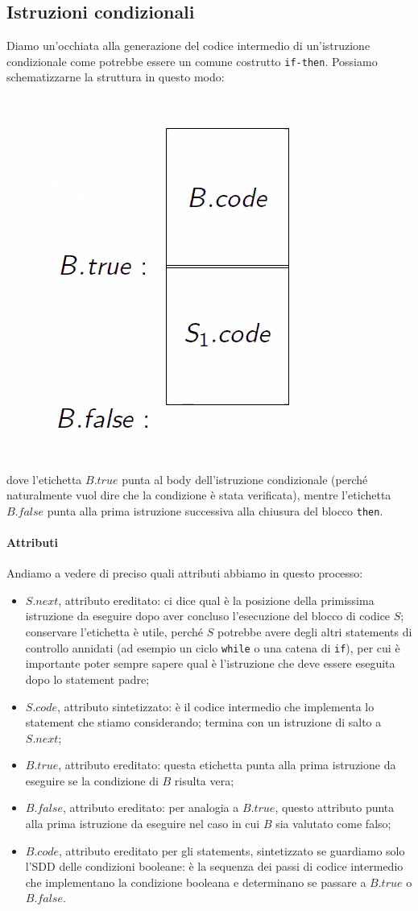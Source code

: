 \documentclass[class=book, crop=false, oneside, 12pt]{standalone}
\begin{document}
\subsection{Istruzioni condizionali}
Diamo un'occhiata alla generazione del codice intermedio di un'istruzione condizionale come potrebbe essere un comune costrutto \texttt{if-then}. Possiamo schematizzarne la struttura in questo modo:
\begin{figure}[H]
    \centering
    \includegraphics[width=.3\textwidth]{if-then-abstract.png}
    \caption{}
    \label{}
\end{figure}
dove l'etichetta \(B.true\) punta al body dell'istruzione condizionale (perché naturalmente vuol dire che la condizione è stata verificata), mentre l'etichetta \(B.false\) punta alla prima istruzione successiva alla chiusura del blocco \texttt{then}.

\paragraph{Attributi}
Andiamo a vedere di preciso quali attributi abbiamo in questo processo:
\begin{itemize}
    \item \(S.next\), attributo ereditato: ci dice qual è la posizione della primissima istruzione da eseguire dopo aver concluso l'esecuzione del blocco di codice \(S\); conservare l'etichetta è utile, perché \(S\) potrebbe avere degli altri statements di controllo annidati (ad esempio un ciclo \texttt{while} o una catena di \texttt{if}), per cui è importante poter sempre sapere qual è l'istruzione che deve essere eseguita dopo lo statement padre;
    \item \(S.code\), attributo sintetizzato: è il codice intermedio che implementa lo statement che stiamo considerando; termina con un istruzione di salto a \(S.next\);
    \item \(B.true\), attributo ereditato: questa etichetta punta alla prima istruzione da eseguire se la condizione di \(B\) risulta vera;
    \item \(B.false\), attributo ereditato: per analogia a \(B.true\), questo attributo punta alla prima istruzione da eseguire nel caso in cui \(B\) sia valutato come falso;
    \item \(B.code\), attributo ereditato per gli statements, sintetizzato se guardiamo solo l'SDD delle condizioni booleane: è la sequenza dei passi di codice intermedio che implementano la condizione booleana e determinano se passare a \(B.true\) o \(B.false\).
\end{itemize}
\end{document}
